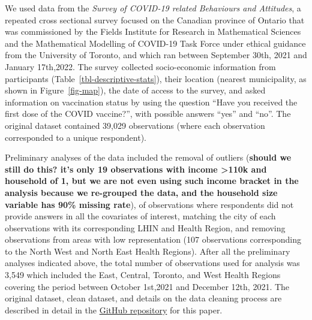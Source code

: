 \documentclass[
  letterpaper,
  DIV=11,
  numbers=noendperiod]{scrartcl}
\begin{document}
We used data from the \emph{Survey of COVID-19 related Behaviours and
Attitudes}, a repeated cross sectional survey focused on the Canadian
province of Ontario that was commissioned by the Fields Institute for
Research in Mathematical Sciences and the Mathematical Modelling of
COVID-19 Task Force under ethical guidance from the University of
Toronto, and which ran between September 30th, 2021 and January
17th,2022. The survey collected socio-economic information from
participants (Table~\ref{tbl-descriptive-stats}), their location
(nearest municipality, as shown in Figure~\ref{fig-map}), the date of
access to the survey, and asked information on vaccination status by
using the question ``Have you received the first dose of the COVID
vaccine?'', with possible answers ``yes'' and ``no''. The original
dataset contained 39,029 observations (where each observation
corresponded to a unique respondent).

Preliminary analyses of the data included the removal of outliers
(\textbf{should we still do this? it's only 19 observations with income
\textgreater110k and household of 1, but we are not even using such
income bracket in the analysis because we re-grouped the data, and the
household size variable has 90\% missing rate}), of observations where
respondents did not provide answers in all the covariates of interest,
matching the city of each observations with its corresponding LHIN and
Health Region, and removing observations from areas with low
representation (107 observations corresponding to the North West and
North East Health Regions). After all the preliminary analyses indicated
above, the total number of observations used for analysis was 3,549
which included the East, Central, Toronto, and West Health Regions
covering the period between October 1st,2021 and December 12th, 2021.
The original dataset, clean dataset, and details on the data cleaning
process are described in detail in the
\href{https://github.com/aimundo/Fields_COVID-19/}{GitHub repository}
for this paper.
\end{document}
